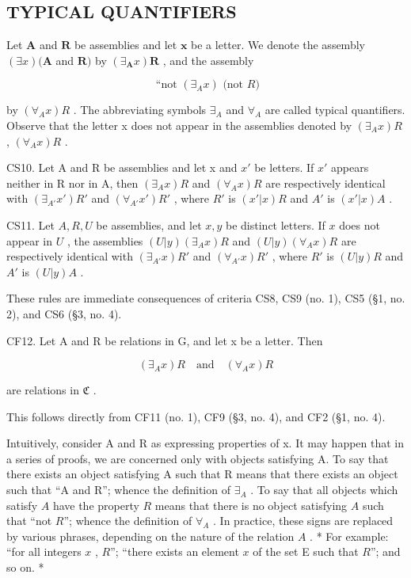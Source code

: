 \subsection{TYPICAL QUANTIFIERS}

Let \(\pmb{A}\) and \(\pmb{R}\) be assemblies and let \(\pmb{x}\) be a letter. We denote the assembly \((\exists x)(\pmb{A}\) and \(\pmb{R})\) by \((\exists_{\pmb{A}}x)\pmb{R}\) , and the assembly

\[
\text {   ``not   } (\exists_ {A} x) \text {   (not   } R)
\]

by \((\forall_{A}x)R\) . The abbreviating symbols \(\exists_{A}\) and \(\forall_{A}\) are called typical quantifiers. Observe that the letter x does not appear in the assemblies denoted by \((\exists_{A}x)R\) , \((\forall_{A}x)R\) .

CS10. Let A and R be assemblies and let x and \(x'\) be letters. If \(x'\) appears neither in R nor in A, then \((\exists_{A}x)R\) and \((\forall_{A}x)R\) are respectively identical with \((\exists_{A'}x')R'\) and \((\forall_{A'}x')R'\) , where \(R'\) is \((x'|x)R\) and \(A'\) is \((x'|x)A\) .

CS11. Let \(A, R, U\) be assemblies, and let \(x, y\) be distinct letters. If \(x\) does not appear in \(U\) , the assemblies \((U|y)(\exists_A x)R\) and \((U|y)(\forall_A x)R\) are respectively identical with \((\exists_{A'}x)R'\) and \((\forall_{A'}x)R'\) , where \(R'\) is \((U|y)R\) and \(A'\) is \((U|y)A\) .

These rules are immediate consequences of criteria CS8, CS9 (no. 1), CS5 (§1, no. 2), and CS6 (§3, no. 4).

CF12. Let A and R be relations in G, and let x be a letter. Then

\[
(\exists_ {A} x) R \quad \text{and} \quad (\forall_ {A} x) R
\]

are relations in \(\mathfrak{C}\) .

This follows directly from CF11 (no. 1), CF9 (§3, no. 4), and CF2 (§1, no. 4).

Intuitively, consider A and R as expressing properties of x. It may happen that in a series of proofs, we are concerned only with objects satisfying A. To say that there exists an object satisfying A such that R means that there exists an object such that ``A and R''; whence the definition of \(\exists_{A}\) . To say that all objects which satisfy \(A\) have the property \(R\) means that there is no object satisfying \(A\) such that ``not \(R\)''; whence the definition of \(\forall_{A}\) . In practice, these signs are replaced by various phrases, depending on the nature of the relation \(A\) . * For example: ``for all integers \(x\) , \(R\)''; ``there exists an element \(x\) of the set E such that \(R\)''; and so on. *

